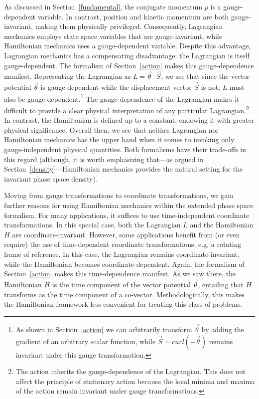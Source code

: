\documentclass[letterpaper]{article}
\renewcommand{\vector}[1]{\ensuremath{\vec{#1}}} %
\begin{document}

As discussed in Section~\ref{fundamental}, the conjugate momentum $p$ is a gauge-dependent variable. In contrast, position and kinetic momentum are both gauge-invariant, making them physically privileged. Consequently, Lagrangian mechanics employs state space variables that are gauge-invariant, while Hamiltonian mechanics uses a gauge-dependent variable. Despite this advantage, Lagrangian mechanics has a compensating disadvantage: the Lagrangian is itself gauge-dependent. The formalism of Section~\ref{action} makes this gauge-dependence manifest. Representing the Lagrangian as $L =\vector{\theta} \cdot \vector{S} $, we see that since the vector potential $\vector{\theta}$ is gauge-dependent while the displacement vector $\vector{S}$ is not, $L$ must also be gauge-dependent.\footnote{As shown in Section~\ref{action} we can arbitrarily transform $\vector{\theta}$ by adding the gradient of an arbitrary scalar function, while $\vector{S}=curl(-\vector{\theta}) $ remains invariant under this gauge transformation.} The gauge-dependence of the Lagrangian makes it difficult to provide a clear physical interpretation of any particular Lagrangian.\footnote{The action inherits the gauge-dependence of the Lagrangian. This does not affect the principle of stationary action because the local minima and maxima of the action remain invariant under gauge transformations.} In contrast, the Hamiltonian is defined up to a constant, endowing it with greater physical significance. Overall then, we see that neither Lagrangian nor Hamiltonian mechanics has the upper hand when it comes to invoking only gauge-independent physical quantities. Both formalisms have their trade-offs in this regard (although, it is worth emphasizing that---as argued in Section~\ref{density}---Hamiltonian mechanics provides the natural setting for the invariant phase space density).

Moving from gauge transformations to coordinate transformations, we gain further reasons for using Hamiltonian mechanics within the extended phase space formalism. For many applications, it suffices to use time-independent coordinate transformations. In this special case, both the Lagrangian $L$ and the Hamiltonian $H$ are coordinate-invariant. However, some applications benefit from (or even require) the use of time-dependent coordinate transformations, e.g. a rotating frame of reference. In this case, the Lagrangian remains coordinate-invariant, while the Hamiltonian becomes coordinate-dependent. Again, the formalism of Section~\ref{action} makes this time-dependence manifest. As we saw there, the Hamiltonian $H$ is the time component of the vector potential $\vector{\theta} $, entailing that $H$ transforms as the time component of a co-vector. Methodologically, this makes the Hamiltonian framework less convenient for treating this class of problems.
\end{document}
